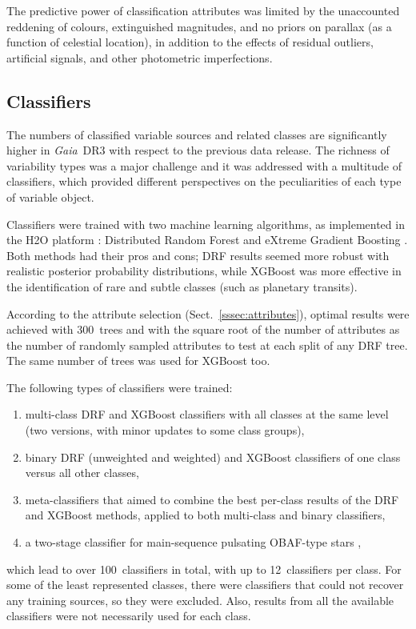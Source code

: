 \documentclass[longauth]{aa}
\def\gdr3{\textit{Gaia}~DR3\xspace}
\begin{document}
The predictive power of classification attributes was limited by the unaccounted reddening of colours, extinguished magnitudes, and no priors on parallax (as a function of celestial location), in addition to the effects of residual outliers, artificial signals, and other photometric imperfections. 
 

\subsection{Classifiers\label{ssec:classifier}}

The numbers of classified variable sources and related classes are significantly higher in \gdr3 with respect to the previous data release. 
The richness of variability types was a major challenge and it was addressed with a multitude of classifiers, which provided different perspectives on the peculiarities of each type of variable object. 

Classifiers were trained with two machine learning algorithms, as implemented in the H2O platform \citep{h2o_platform}: Distributed Random Forest \citep[DRF;][]{Breiman.Random.Forest} and eXtreme Gradient Boosting \citep[XGBoost;][]{Chen:2016:XST:2939672.2939785}. Both methods had their pros and cons; DRF results seemed more robust with realistic posterior probability distributions, while XGBoost was more effective in the identification of rare and subtle classes (such as planetary transits). 

According to the attribute selection (Sect.~\ref{sssec:attributes}), optimal results were achieved with 300~trees and with the square root of the number of attributes as the number of randomly sampled attributes to test at each split of any DRF tree. The same number of trees was used for XGBoost too.

The following types of classifiers were trained:
\begin{enumerate}
    \item multi-class DRF and XGBoost classifiers with all classes at the same level (two versions, with minor updates to some class groups),
    \item binary DRF (unweighted and weighted) and XGBoost classifiers of one class versus all other classes,
    \item meta-classifiers that aimed to combine the best per-class results of the DRF and XGBoost methods, applied to both multi-class and binary classifiers,
    \item a two-stage classifier for main-sequence pulsating OBAF-type stars \citep{DR3-DPACP-79},
\end{enumerate}
which lead to over 100~classifiers in total, with up to 12~classifiers per class.
For some of the least represented classes, there were classifiers that could not recover any training sources, so they were excluded.
Also, results from all the available classifiers were not necessarily used for each class.
\end{document}
